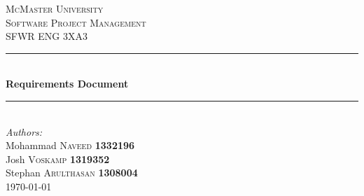 \documentclass[12pt]{article}
\begin{document}
\sloppy

\begin{titlepage}

\newcommand{\HRule}{\rule{\linewidth}{0.5mm}} %

\center %


\textsc{\LARGE McMaster University}\\[1.5cm] %
\textsc{\Large Software Project Management}\\[0.5cm] %
\textsc{\large SFWR ENG 3XA3}\\[0.5cm] %


\HRule \\[0.4cm]
{ \huge \bfseries Requirements Document}\\[0.4cm] %
\HRule \\[1.5cm]




\Large \emph{Authors:}\\
Mohammad \textsc{Naveed} \textbf{1332196} \\ %
Josh \textsc{Voskamp} \textbf{1319352} \\
Stephan \textsc{Arulthasan} \textbf{1308004} \\[3cm]

{\large \today}\\[3cm] %


\end{titlepage}
\end{document}
